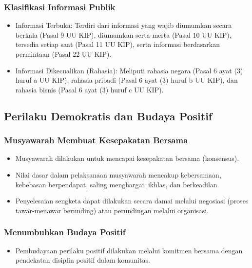 \subsubsection{Klasifikasi Informasi Publik}
\begin{itemize}
\item Informasi Terbuka: Terdiri dari informasi yang wajib diumumkan secara berkala (Pasal 9 UU KIP), diumumkan serta-merta (Pasal 10 UU KIP), tersedia setiap saat (Pasal 11 UU KIP), serta informasi berdasarkan permintaan (Pasal 22 UU KIP).
\item Informasi Dikecualikan (Rahasia): Meliputi rahasia negara (Pasal 6 ayat (3) huruf a UU KIP), rahasia pribadi (Pasal 6 ayat (3) huruf b UU KIP), dan rahasia bisnis (Pasal 6 ayat (3) huruf c UU KIP).
\end{itemize}

\subsection{Perilaku Demokratis dan Budaya Positif}

\subsubsection{Musyawarah Membuat Kesepakatan Bersama}
\begin{itemize}
\item Musyawarah dilakukan untuk mencapai kesepakatan bersama (konsensus).
\item Nilai dasar dalam pelaksanaan musyawarah mencakup kebersamaan, kebebasan berpendapat, saling menghargai, ikhlas, dan berkeadilan.
\item Penyelesaian sengketa dapat dilakukan secara damai melalui negosiasi (proses tawar-menawar berunding) atau perundingan melalui organisasi.
\end{itemize}

\subsubsection{Menumbuhkan Budaya Positif}
\begin{itemize}
\item Pembudayaan perilaku positif dilakukan melalui komitmen bersama dengan pendekatan disiplin positif dalam komunitas.
\end{itemize}

